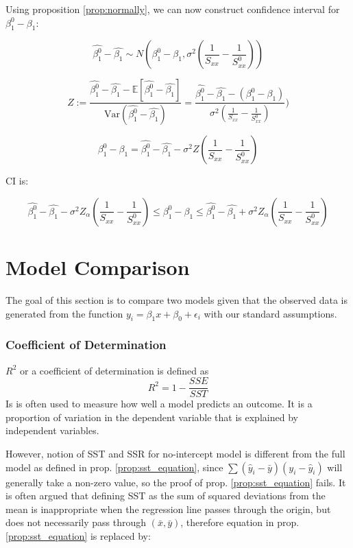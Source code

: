 \documentclass[12pt,a4paper,oneside]{book} %
\newcommand{\E}{\mathbb{E}}
\newcommand{\Var}{\mathrm{Var}}
\begin{document}
Using proposition \ref{prop:normally}, we can now construct confidence interval for $\beta_1^0-\beta_1$:

\[
			\hat{\beta_1^0}-\hat{\beta_1} \sim N(\beta_1^0-\beta_1, \sigma^2(\frac{1}{S_{xx}}-\frac{1}{S_{xx}^0}))
\]

\[
	Z := \frac{\hat{\beta_1^0}-\hat{\beta_1}-\E [\hat{\beta_1^0}-\hat{\beta_1}]}{\Var (\hat{\beta_1^0}-\hat{\beta_1})}= \frac{\hat{\beta_1^0}-\hat{\beta_1}-(\beta_1^0-\beta_1)}{\sigma^2(\frac{1}{S_{xx}}-\frac{1}{S_{xx}^0})})
\]

\[
	\beta_1^0-\beta_1= \hat{\beta_1^0}-\hat{\beta_1} - \sigma^2 Z(\frac{1}{S_{xx}}-\frac{1}{S_{xx}^0})
\]

CI is:

\begin{equation}
\hat{\beta_1^0}-\hat{\beta_1} - \sigma^2 Z_{\alpha}(\frac{1}{S_{xx}}-\frac{1}{S_{xx}^0}) \leq \beta_1^0-\beta_1 \leq \hat{\beta_1^0}-\hat{\beta_1} + \sigma^2 Z_{\alpha}(\frac{1}{S_{xx}}-\frac{1}{S_{xx}^0})
\end{equation}




\section{Model Comparison}

The goal of this section is to compare two models given that the observed data is generated from the function $y_i = \beta_1 x + \beta_0 + \epsilon_i$ with our standard assumptions. 

\subsubsection{Coefficient of Determination}

	$R^2$ or a coefficient of determination is defined as $$R^2= 1 - \frac{SSE}{SST}$$
	Is is often used to measure how well a model predicts an outcome. It is a proportion of variation in the dependent variable that is explained by independent variables.
	
	However, notion of SST and SSR for no-intercept model is different from the full model as defined in prop. \ref{prop:sst_equation}, since $\sum (\hat{y}_i-\bar{y})(y_i-\hat{y}_i)$ will generally take a non-zero value, so the proof of prop. \ref{prop:sst_equation} fails. It is often argued \cite{eisenhauer2003regression} that defining SST as the sum of squared deviations from the mean is inappropriate when the regression line passes through the origin, but does not necessarily pass through $(\bar{x}, \bar{y})$,  therefore equation in prop. \ref{prop:sst_equation} is replaced by:
	
\end{document}
